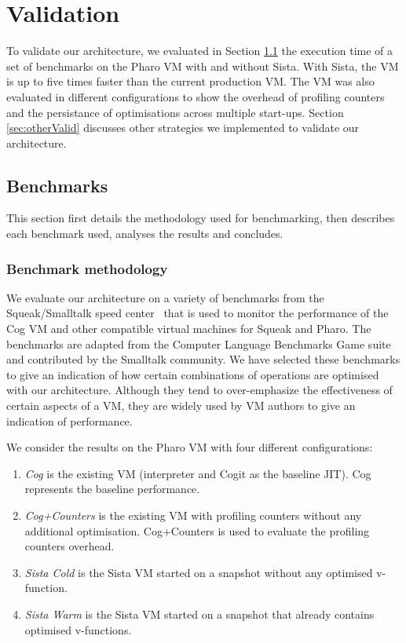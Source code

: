 \documentclass[a4paper,12pt,twoside]{../includes/ThesisStyle}
\begin{document}
\fi

\chapter{Validation}
\label{chap:validation}
\minitoc


To validate our architecture, we evaluated in Section \ref{sec:bench} the execution time of a set of benchmarks on the Pharo VM with and without Sista. With Sista, the VM is up to five times faster than the current production VM. The VM was also evaluated in different configurations to show the overhead of profiling counters and the persistance of optimisations across multiple start-ups. Section \ref{sec:otherValid} discusses other strategies we implemented to validate our architecture.

\section{Benchmarks}
\label{sec:bench}

This section first details the methodology used for benchmarking, then describes each benchmark used, analyses the results and concludes.

\subsection{Benchmark methodology}

We evaluate our architecture on a variety of benchmarks from the Squeak/Smalltalk speed center~\cite{Felg16a} that is used to monitor the performance of the Cog VM and other compatible virtual machines for Squeak and Pharo. The benchmarks are adapted from the Computer Language Benchmarks Game suite \cite{GameBenchs} and contributed by the Smalltalk community. We have selected these benchmarks to give an indication of how certain combinations of operations are optimised with our architecture. Although they tend to over-emphasize the effectiveness of certain aspects of a VM, they are widely used by VM authors to give an indication of performance.

We consider the results on the Pharo VM with four different configurations:
\begin{enumerate}
	\item \emph{Cog} is the existing VM (interpreter and Cogit as the baseline JIT). Cog represents the baseline performance.
	\item \emph{Cog+Counters} is the existing VM with profiling counters without any additional optimisation. Cog+Counters is used to evaluate the profiling counters overhead.
	\item \emph{Sista Cold} is the Sista VM started on a snapshot without any optimised v-function.
	\item \emph{Sista Warm} is the Sista VM started on a snapshot that already contains optimised v-functions.
\end{enumerate}
\end{document}
